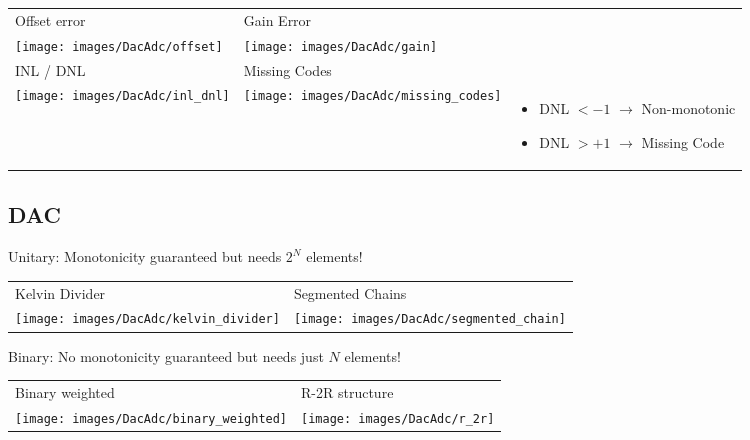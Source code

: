 \begin{tabular}{m{5cm} m{5cm} m{5cm}}
 	Offset error & Gain Error & \\ 
	\texttt{[image: images/DacAdc/offset]} & 
	\texttt{[image: images/DacAdc/gain]} & \\ 
		
	INL / DNL & Missing Codes & \\ 
	\texttt{[image: images/DacAdc/inl\_dnl]} & 
	\texttt{[image: images/DacAdc/missing\_codes]} & 
		\begin{minipage}{0.4\textwidth}
		\begin{itemize}
			\item DNL $< -1$ $\rightarrow$ Non-monotonic
			\item DNL $> +1$ $\rightarrow$ Missing Code
		\end{itemize}
		\end{minipage}\\ 

\end{tabular}

\subsection{DAC}
Unitary: Monotonicity guaranteed but needs $2^N$ elements!

\begin{tabular}{m{8cm} m{6cm}}
 	Kelvin Divider & Segmented Chains \\ 
	\texttt{[image: images/DacAdc/kelvin\_divider]} & 
	\texttt{[image: images/DacAdc/segmented\_chain]} \\ 
\end{tabular}

Binary: No monotonicity guaranteed but needs just $N$ elements!

\begin{tabular}{m{8cm} m{8cm}}
 	Binary weighted & R-2R structure \\ 
	\texttt{[image: images/DacAdc/binary\_weighted]} & 
	\texttt{[image: images/DacAdc/r\_2r]} \\ 
\end{tabular}

